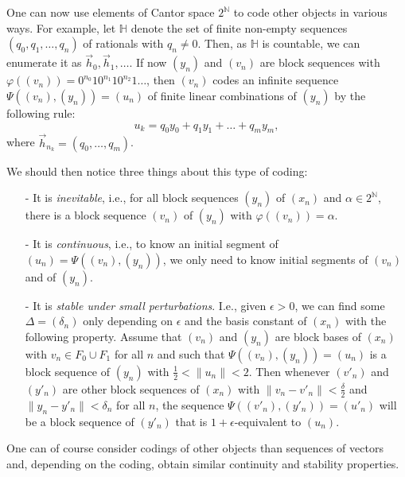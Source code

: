 \documentclass[10pt]{amsart}
\numberwithin{equation}{section}
\begin{document}
One can now use elements of Cantor space ${{2^{\mathbb N}}}$ to code other objects in various
ways. For example, let ${\mathbb H}$ denote the set of finite non-empty sequences
$(q_0,q_1,\ldots,q_n)$ of rationals with $q_n\neq 0$. Then, as ${\mathbb H}$ is
countable, we can enumerate it as $\vec h_0,\vec h_1,\ldots$. If now $(y_n)$
and $(v_n)$ are block sequences with
$\varphi((v_n))=0^{n_0}10^{n_1}10^{n_2}1\ldots$, then $(v_n)$ codes an infinite
sequence $\Psi((v_n),(y_n))=(u_n)$ of finite linear combinations of $(y_n)$ by
the following rule:
\[
u_k=q_0y_0+q_1y_1+\ldots+q_my_m,
\]
where $\vec h_{n_k}=(q_0,\ldots,q_m)$.

We should then notice three things about this type of coding:
\begin{itemize}
  \item [-] It is {\em inevitable}, i.e., for all block sequences $(y_n)$ of $(x_n)$
  and $\alpha\in {{2^{\mathbb N}}}$, there is a block sequence $(v_n)$ of $(y_n)$ with
  $\varphi((v_n))=\alpha$.
  \item [-] It is {\em continuous}, i.e., to know an initial segment of
  $(u_n)=\Psi((v_n),(y_n))$, we only need to know initial segments of
  $(v_n)$ and of $(y_n)$.
  \item [-] It is {\em stable under small perturbations}. I.e., given ${\epsilon}>0$, we can
  find some $\Delta=(\delta_n)$ only depending on ${\epsilon}$ and the basis
  constant of $(x_n)$ with the following property. Assume that $(v_n)$ and
  $(y_n)$ are block bases of $(x_n)$ with $v_n\in F_0\cup F_1$ for all $n$
  and such that $\Psi((v_n),(y_n))=(u_n)$ is a block sequence of $(y_n)$
  with $\frac 12<\|u_n\|<2$. Then whenever $(v'_n)$ and $(y'_n)$ are other
  block sequences of $(x_n)$ with $\|v_n-v'_n\|<\frac\delta2$ and
  $\|y_n-y'_n\|<\delta_n$ for all $n$, the sequence
  $\Psi((v'_n),(y'_n))=(u'_n)$ will be a block sequence of $(y'_n)$ that is
  $1+{\epsilon}$-equivalent to $(u_n)$.
\end{itemize}

One can of course consider codings of other objects than sequences of vectors
and, depending on the coding, obtain similar continuity and stability
properties.
\end{document}
